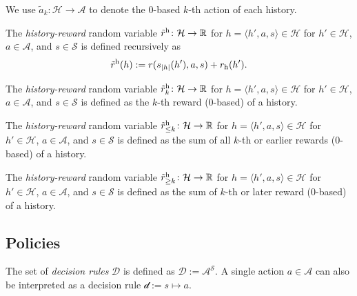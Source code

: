 \begin{definition}
  We use $\tilde{a}_k\colon \mathcal{H} \to \mathcal{A}$ to denote the 0-based $k$-th action of each history.
\end{definition}

\begin{definition} \label{def:reward}
The \emph{history-reward} random variable $\tilde{r}^{\mathrm{h}}\colon \mathcal{H} \to \mathbb{R}$ for $h = \langle h', a, s \rangle \in  \mathcal{H}$ for $h'\in \mathcal{H}$, $a\in \mathcal{A}$, and $s\in \mathcal{S}$ is defined recursively as
\[
\tilde{r}^{\mathrm{h}}(h) := r(s_{|h|}(h'), a, s) + r_{\mathrm{h}}(h').
\]
\end{definition}

\begin{definition}\label{reward_at}
The \emph{history-reward} random variable $\tilde{r}^{\mathrm{h}}_k \colon \mathcal{H} \to \mathbb{R}$ for $h = \langle h', a, s \rangle \in  \mathcal{H}$ for $h'\in \mathcal{H}$, $a\in \mathcal{A}$, and $s\in \mathcal{S}$ is defined as the $k$-th reward (0-based) of a history.
\end{definition}

\begin{definition}\label{reward_to}
The \emph{history-reward} random variable $\tilde{r}^{\mathrm{h}}_{\le k} \colon \mathcal{H} \to \mathbb{R}$ for $h = \langle h', a, s \rangle \in  \mathcal{H}$ for $h'\in \mathcal{H}$, $a\in \mathcal{A}$, and $s\in \mathcal{S}$ is defined as the sum of all $k$-th or earlier rewards (0-based) of a history.
\end{definition}

\begin{definition}\label{reward_from}
The \emph{history-reward} random variable $\tilde{r}^{\mathrm{h}}_{\ge k}\colon \mathcal{H} \to \mathbb{R}$ for $h = \langle h', a, s \rangle \in  \mathcal{H}$ for $h'\in \mathcal{H}$, $a\in \mathcal{A}$, and $s\in \mathcal{S}$ is defined as the sum of $k$-th or later reward (0-based) of a history.
\end{definition}

\subsection{Policies}

\begin{definition} \label{def:decision-rule}
The set of \emph{decision rules} $\mathcal{D}$ is defined as \(\mathcal{D} := \mathcal{A}^{\mathcal{S}}. \) A single action $a \in \mathcal{A}$ can also be interpreted as a decision rule $\mathcal{d} := s \mapsto a$.
\end{definition}

